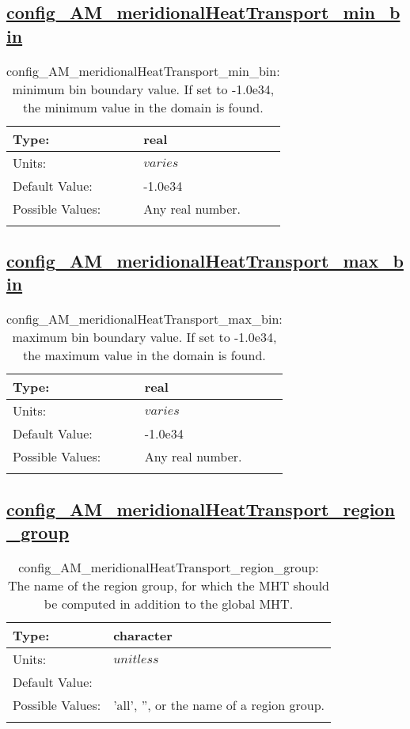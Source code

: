 \subsection[config\_AM\_meridionalHeatTransport\_min\_bin]{\hyperref[sec:nm_tab_AM_meridionalHeatTransport]{config\_AM\_meridionalHeatTransport\_min\_bin}}
\label{subsec:nm_sec_config_AM_meridionalHeatTransport_min_bin}
\begin{center}
\begin{longtable}{| p{2.0in} || p{4.0in} |}
    \hline
    Type: & real \\
    \hline
    Units: & $varies$ \\
    \hline
    Default Value: & -1.0e34 \\
    \hline
    Possible Values: & Any real number. \\
    \hline
    \caption{config\_AM\_meridionalHeatTransport\_min\_bin: minimum bin boundary value.  If set to -1.0e34, the minimum value in the domain is found.}
\end{longtable}
\end{center}
\subsection[config\_AM\_meridionalHeatTransport\_max\_bin]{\hyperref[sec:nm_tab_AM_meridionalHeatTransport]{config\_AM\_meridionalHeatTransport\_max\_bin}}
\label{subsec:nm_sec_config_AM_meridionalHeatTransport_max_bin}
\begin{center}
\begin{longtable}{| p{2.0in} || p{4.0in} |}
    \hline
    Type: & real \\
    \hline
    Units: & $varies$ \\
    \hline
    Default Value: & -1.0e34 \\
    \hline
    Possible Values: & Any real number. \\
    \hline
    \caption{config\_AM\_meridionalHeatTransport\_max\_bin: maximum bin boundary value.  If set to -1.0e34, the maximum value in the domain is found.}
\end{longtable}
\end{center}
\subsection[config\_AM\_meridionalHeatTransport\_region\_group]{\hyperref[sec:nm_tab_AM_meridionalHeatTransport]{config\_AM\_meridionalHeatTransport\_region\_group}}
\label{subsec:nm_sec_config_AM_meridionalHeatTransport_region_group}
\begin{center}
\begin{longtable}{| p{2.0in} || p{4.0in} |}
    \hline
    Type: & character \\
    \hline
    Units: & $unitless$ \\
    \hline
    Default Value: &  \\
    \hline
    Possible Values: & 'all', '', or the name of a region group. \\
    \hline
    \caption{config\_AM\_meridionalHeatTransport\_region\_group: The name of the region group, for which the MHT should be computed in addition to the global MHT.}
\end{longtable}
\end{center}
